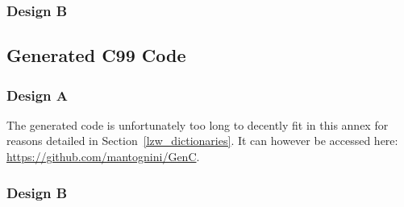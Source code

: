 \documentclass[a4paper,twoside]{article}
\newcommand{\RefSec}[1]{Section~\ref{#1}}
\begin{document}
\begin{landscape}
\clearpage
\subsubsection*{Design B}
\label{lzw_impl_scala_b}


\clearpage
\subsection{Generated C99 Code}

\subsubsection*{Design A}
\label{lzw_impl_c_b}

The generated code is unfortunately too long to decently fit in this annex for
reasons detailed in \RefSec{lzw_dictionaries}. It can however be accessed here:
\url{https://github.com/mantognini/GenC}.

\subsubsection*{Design B}
\label{lzw_impl_c_b}


\end{landscape}

\clearpage



\end{document}
